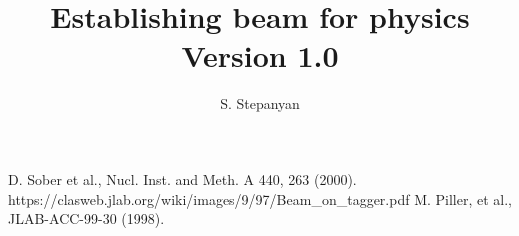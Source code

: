 \documentclass[12pt]{article}
\newcommand{\versionnumber}{1.0}
\begin{document}
\title{Establishing beam for physics \\\normalsize Version \versionnumber}
\author{S. Stepanyan}
\maketitle


\begin{thebibliography}{00}
 D. Sober et al., Nucl. Inst. and Meth. A 440, 263 (2000).
 https://clasweb.jlab.org/wiki/images/9/97/Beam\_on\_tagger.pdf
 M. Piller, et al., JLAB-ACC-99-30 (1998).
\end{thebibliography}
\end{document}
